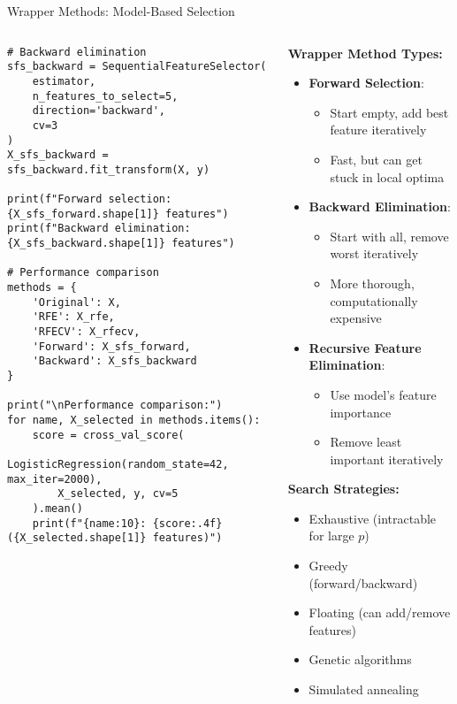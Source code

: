 \documentclass[aspectratio=169,11pt]{beamer}
\begin{document}
\begin{frame}[fragile]{Wrapper Methods: Model-Based Selection}
\begin{columns}
\begin{column}{0.55\textwidth}
\begin{lstlisting}
# Backward elimination
sfs_backward = SequentialFeatureSelector(
    estimator,
    n_features_to_select=5, 
    direction='backward',
    cv=3
)
X_sfs_backward = sfs_backward.fit_transform(X, y)

print(f"Forward selection: {X_sfs_forward.shape[1]} features")
print(f"Backward elimination: {X_sfs_backward.shape[1]} features")

# Performance comparison
methods = {
    'Original': X,
    'RFE': X_rfe,
    'RFECV': X_rfecv,
    'Forward': X_sfs_forward,
    'Backward': X_sfs_backward
}

print("\nPerformance comparison:")
for name, X_selected in methods.items():
    score = cross_val_score(
        LogisticRegression(random_state=42, max_iter=2000), 
        X_selected, y, cv=5
    ).mean()
    print(f"{name:10}: {score:.4f} ({X_selected.shape[1]} features)")
\end{lstlisting}
\end{column}
\begin{column}{0.45\textwidth}
\textbf{Wrapper Method Types:}

\begin{itemize}
\item \textbf{Forward Selection}:
  \begin{itemize}
  \item Start empty, add best feature iteratively
  \item Fast, but can get stuck in local optima
  \end{itemize}

\item \textbf{Backward Elimination}:
  \begin{itemize}
  \item Start with all, remove worst iteratively
  \item More thorough, computationally expensive
  \end{itemize}

\item \textbf{Recursive Feature Elimination}:
  \begin{itemize}
  \item Use model's feature importance
  \item Remove least important iteratively
  \end{itemize}
\end{itemize}

\vspace{0.3cm}
\textbf{Search Strategies:}
\begin{itemize}
\item Exhaustive (intractable for large $p$)
\item Greedy (forward/backward)
\item Floating (can add/remove features)
\item Genetic algorithms
\item Simulated annealing
\end{itemize}


\end{column}
\end{columns}
\end{frame}
\end{document}
